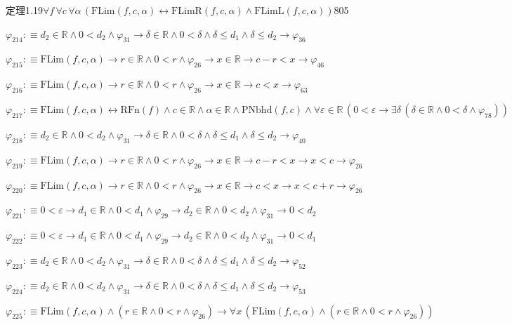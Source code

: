 \begin{fullproof}{定理1.19}{$\forall f\,\forall c\,\forall \alpha\,(\mathrm{FLim}(f,c,\alpha) \leftrightarrow \mathrm{FLimR}(f,c,\alpha) \land \mathrm{FLimL}(f,c,\alpha))$}{805}
\begin{abbrevlist}
\item $\varphi_{214} :\equiv d_{2} \in \mathbb{R} \land 0 < d_{2} \land \varphi_{31} \to \delta \in \mathbb{R} \land 0 < \delta \land \delta \leq d_{1} \land \delta \leq d_{2} \to \varphi_{36}$
\item $\varphi_{215} :\equiv \mathrm{FLim}(f,c,\alpha) \to r \in \mathbb{R} \land 0 < r \land \varphi_{26} \to x \in \mathbb{R} \to c - r < x \to \varphi_{46}$
\item $\varphi_{216} :\equiv \mathrm{FLim}(f,c,\alpha) \to r \in \mathbb{R} \land 0 < r \land \varphi_{26} \to x \in \mathbb{R} \to c < x \to \varphi_{63}$
\item $\varphi_{217} :\equiv \mathrm{FLim}(f,c,\alpha) \leftrightarrow \mathrm{RFn}(f) \land c \in \mathbb{R} \land \alpha \in \mathbb{R} \land \mathrm{PNbhd}(f,c) \land \forall \varepsilon \in \mathbb{R}\,(0 < \varepsilon \to \exists \delta\,(\delta \in \mathbb{R} \land 0 < \delta \land \varphi_{78}))$
\item $\varphi_{218} :\equiv d_{2} \in \mathbb{R} \land 0 < d_{2} \land \varphi_{31} \to \delta \in \mathbb{R} \land 0 < \delta \land \delta \leq d_{1} \land \delta \leq d_{2} \to \varphi_{40}$
\item $\varphi_{219} :\equiv \mathrm{FLim}(f,c,\alpha) \to r \in \mathbb{R} \land 0 < r \land \varphi_{26} \to x \in \mathbb{R} \to c - r < x \to x < c \to \varphi_{26}$
\item $\varphi_{220} :\equiv \mathrm{FLim}(f,c,\alpha) \to r \in \mathbb{R} \land 0 < r \land \varphi_{26} \to x \in \mathbb{R} \to c < x \to x < c + r \to \varphi_{26}$
\item $\varphi_{221} :\equiv 0 < \varepsilon \to d_{1} \in \mathbb{R} \land 0 < d_{1} \land \varphi_{29} \to d_{2} \in \mathbb{R} \land 0 < d_{2} \land \varphi_{31} \to 0 < d_{2}$
\item $\varphi_{222} :\equiv 0 < \varepsilon \to d_{1} \in \mathbb{R} \land 0 < d_{1} \land \varphi_{29} \to d_{2} \in \mathbb{R} \land 0 < d_{2} \land \varphi_{31} \to 0 < d_{1}$
\item $\varphi_{223} :\equiv d_{2} \in \mathbb{R} \land 0 < d_{2} \land \varphi_{31} \to \delta \in \mathbb{R} \land 0 < \delta \land \delta \leq d_{1} \land \delta \leq d_{2} \to \varphi_{52}$
\item $\varphi_{224} :\equiv d_{2} \in \mathbb{R} \land 0 < d_{2} \land \varphi_{31} \to \delta \in \mathbb{R} \land 0 < \delta \land \delta \leq d_{1} \land \delta \leq d_{2} \to \varphi_{53}$
\item $\varphi_{225} :\equiv \mathrm{FLim}(f,c,\alpha) \land (r \in \mathbb{R} \land 0 < r \land \varphi_{26}) \to \forall x\,(\mathrm{FLim}(f,c,\alpha) \land (r \in \mathbb{R} \land 0 < r \land \varphi_{26}))$

\end{abbrevlist}
\end{fullproof}
